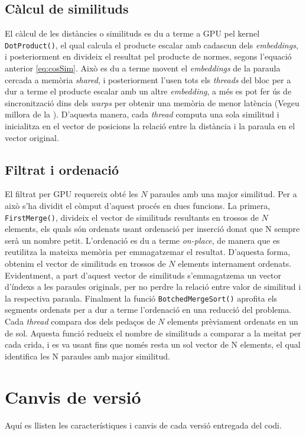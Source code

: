 \documentclass[catalan,10pt,a4paper]{article}
\begin{document}
\subsection*{Càlcul de similituds}
El càlcul de les distàncies o similituds es du a terme a GPU pel kernel \verb|DotProduct()|, el qual calcula el producte escalar amb cadascun dels \textit{embeddings}, i posteriorment en divideix el resultat pel producte de normes, segons l'equació anterior \ref{eq:cosSim}.
Això es du a terme movent el \textit{embeddings} de la paraula cercada a memòria \textit{shared}, i posteriorment l'usen tots els \textit{threads} del bloc per a dur a terme el producte escalar amb un altre \textit{embedding}, a més es pot fer ús de sincronització dins dels \textit{warps} per obtenir una memòria de menor latència (Vegeu millora de la ).
D'aquesta manera, cada \textit{thread} computa una sola similitud i inicialitza en el vector de posicions la relació entre la distància i la paraula en el vector original.
\subsection*{Filtrat i ordenació}
El filtrat per GPU requereix obté les $N$ paraules amb una major similitud. Per a això s'ha dividit el còmput d'aquest procés en dues funcions.
La primera, \verb|FirstMerge()|, divideix el vector de similituds resultants en trossos de $N$ elements, els quals són ordenats usant ordenació per inserció donat que N sempre serà un nombre petit. L'ordenació es du a terme \textit{on-place}, de manera que es reutilitza la mateixa memòria per emmagatzemar el resultat.\newline
D'aquesta forma, obtenim el vector de similituds en trossos de $N$ elements internament ordenats. Evidentment, a part d'aquest vector de similituds s'emmagatzema un vector d'índexs a les paraules originals, per no perdre la relació entre valor de similitud i la respectiva paraula.
Finalment la funció \verb|BotchedMergeSort()| aprofita els segments ordenats per a dur a terme l'ordenació en una reducció del problema. Cada \textit{thread} compara dos dels pedaços de $N$ elements prèviament ordenats en un de sol.\newline
Aquesta funció redueix el nombre de similituds a comparar a la meitat per cada crida, i es va usant fins que només resta un sol vector de N elements, el qual identifica les N paraules amb major similitud.
\section*{Canvis de versió}
Aquí es llisten les característiques i canvis de cada versió entregada del codi.
\end{document}
